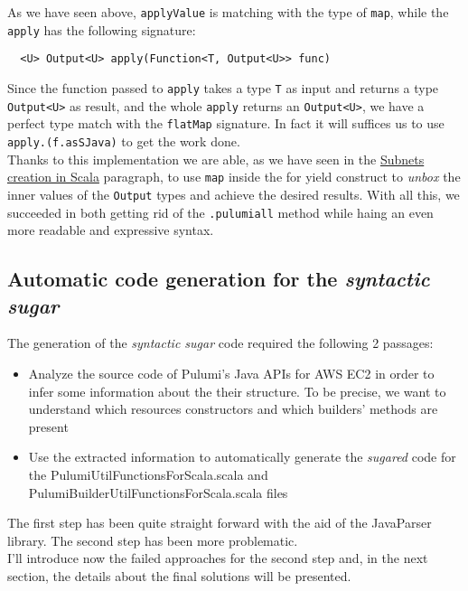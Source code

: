 As we have seen above, \texttt{applyValue} is matching with the type of \texttt{map}, while the \texttt{apply} has the following signature:
\begin{verbatim}
  <U> Output<U> apply(Function<T, Output<U>> func)
\end{verbatim}
Since the function passed to \texttt{apply} takes a type \texttt{T} as input and returns a type \texttt{Output<U>} as result, and the whole \texttt{apply} returns an \texttt{Output<U>}, we have a perfect type match with the \texttt{flatMap} signature.
In fact it will suffices us to use \texttt{apply.(f.asSJava)} to get the work done.\\
Thanks to this implementation we are able, as we have seen in the \hyperref[sssec:subnets-creation]{Subnets creation in Scala} paragraph, 
to use \texttt{map} inside the for yield construct to \textit{unbox} the inner values of the \texttt{Output} types and achieve the desired results.
With all this, we succeeded in both getting rid of the \texttt{.pulumiall} method while haing an even more readable and expressive syntax.

\subsection{Automatic code generation for the \textit{syntactic sugar}}
The generation of the \textit{syntactic sugar} code required the following 2 passages:
\begin{itemize}
  \item Analyze the source code of Pulumi's Java APIs for AWS EC2 in order to infer some information about the their structure. To be precise, we want to understand which resources constructors and which builders' methods are present%
  \item Use the extracted information to automatically generate the \textit{sugared} code for the PulumiUtilFunctionsForScala.scala and PulumiBuilderUtilFunctionsForScala.scala files
\end{itemize}
The first step has been quite straight forward with the aid of the JavaParser library.
The second step has been more problematic.\\
I'll introduce now the failed approaches for the second step and, in the next section, the details about the final solutions will be presented.

